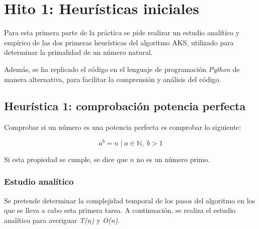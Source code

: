 \documentclass{uc3mpracticas}
\begin{document}
  \frontmatter



  \vspace{55mm}


  \newpage

  \tableofcontents

  \newpage

  \mainmatter


  \section{Hito 1: Heurísticas iniciales}

Para esta primera parte de la práctica se pide realizar un estudio analítico y empírico de las dos primeras heurísticas del algoritmo AKS, utilizado para determinar la primalidad de un número natural.

\vspace{2mm}

Además, se ha replicado el código en el lenguaje de programación \textit{Python} de manera alternativa, para facilitar la comprensión y análisis del código.


\subsection{Heurística 1: comprobación potencia perfecta}

Comprobar si un número es una potencia perfecta es comprobar lo siguiente:

$$ a^b = n \; | \; a \in \mathbb{N}, \; b>1$$

Si esta propiedad se cumple, se dice que $n$ no es un número primo.


\subsubsection{Estudio analítico}
Se pretende determinar la complejidad temporal de los pasos del algoritmo en los que se lleva a cabo esta primera tarea. A continuación, se realiza el estudio analítico para averiguar \textit{T(n)} y \textit{O(n)}.
\end{document}
